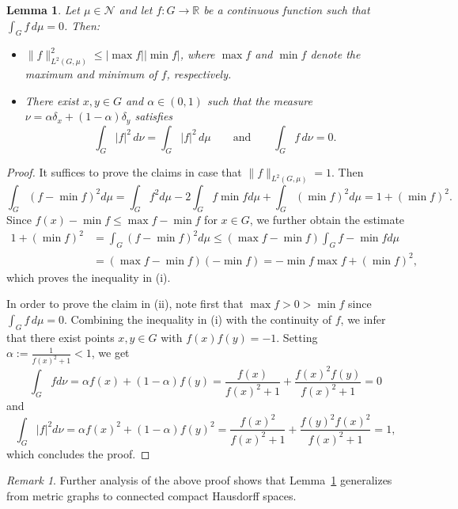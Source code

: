 \documentclass[reqno]{amsart}
\theoremstyle{plain}
\newtheorem{lem}[thm]{Lemma}
\theoremstyle{definition}
\theoremstyle{remark}
\newtheorem{rmk}[thm]{Remark}
\numberwithin{equation}{section}
\newcommand{\R}{\mathbb{R}}     %
\newcommand{\cN}{\mathcal{N}}
\begin{document}
\begin{lem} \label{lem:KeyLemma}
	Let $\mu \in \cN$ and let $f\colon G \to \R$ be a continuous function such that $\int_Gf \, d\mu =0$. Then:
	\begin{itemize}
		\item [(i)] $\|f\|_{L^2(G, \mu)}^2 \le |\max f| |\min f| $, where $\max f$ and $\min f$ denote the maximum and minimum of $f$, respectively.
		\item [(ii)]  There exist $x,y \in G$ and $\alpha \in (0,1)$ such that the measure $\nu = \alpha \delta_{x} + (1-\alpha) \delta_{y}$ satisfies
		\[
		\int_{G}|f|^2 \, d \nu = \int_G|f|^2 \, d\mu \qquad \text{and} \qquad \int_{G} f \, d\nu  = 0.
		\]
	\end{itemize}
\end{lem}
\begin{proof}
	It suffices to prove the claims in case that $\|f\|_{L^2(G,\mu)} = 1$. Then
	\[
	\int_{G} (f- \min f)^2 d\mu = \int_{G} f^2 d \mu - 2 \int_{G} f \min f d \mu + \int_{G} (\min f)^2 d \mu = 1 + (\min f)^2.
	\]
	Since $f(x)-\min f \leq \max f - \min f$ for $ x \in G$, we further obtain the estimate
	\begin{align*}
		1 + (\min f)^2 & = \int_{G} (f- \min f )^2 d\mu \leq ( \max f  - \min f) \int_{G} f-\min f d\mu \\
		& = ( \max f  - \min f ) (- \min f) = - \min f \max f + (\min f)^2,
	\end{align*}
	which proves the inequality in (i).
	
	In order to prove the claim in (ii), note first that $\max f  > 0 > \min f$ since $\int_G f \, d\mu = 0$. Combining the inequality in (i) with the continuity of $f$, we infer that there exist points $x,y  \in G$ with $f(x)f(y)=-1$. Setting $\alpha := \frac{1}{f(x)^2+1} < 1$, we get
	\[
	\int_{G} f d \nu = \alpha f(x) + (1-\alpha) f(y) = \frac{f(x)}{f(x)^2+1} + \frac{f(x)^2 f(y)}{f(x)^2+1} = 0
	\]
	and
	\[
	\int_{G} |f|^2 d \nu = \alpha f(x)^2 + (1- \alpha) f(y)^2 = \frac{f(x)^2}{f(x)^2+1} + \frac{f(y)^2f(x)^2}{f(x)^2+1} = 1,
	\]
	which concludes the proof.
	
	
\end{proof}

\begin{rmk}
	Further analysis of the above proof shows that Lemma~\ref{lem:KeyLemma} generalizes from metric graphs to connected compact Hausdorff spaces.
\end{rmk}
\end{document}
